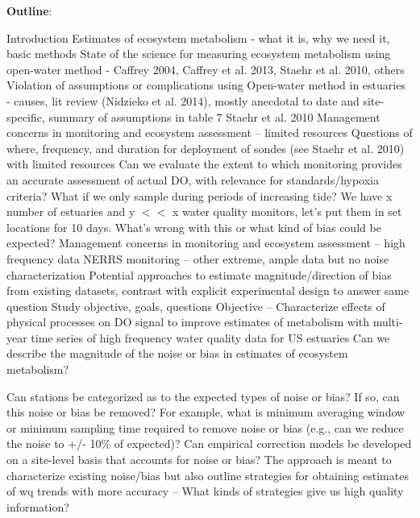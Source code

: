 \documentclass[letterpaper,12pt,oneside]{article}
\begin{document}
\textbf{Outline}:
\begin{outline}
\1 Introduction
\2 Estimates of ecosystem metabolism - what it is, why we need it, basic methods
\2 State of the science for measuring ecosystem metabolism using open-water method - Caffrey 2004, Caffrey et al. 2013, Staehr et al. 2010, others
\2 Violation of assumptions or complications using Open-water method in estuaries - causes, lit review (Nidzieko et al. 2014), mostly anecdotal to date and site-specific, summary of assumptions in table 7 Staehr et al. 2010
\2 Management concerns in monitoring and ecosystem assessment --  limited resources
\3 Questions of where, frequency, and duration for deployment of sondes (see Staehr et al. 2010) with limited resources
\3 Can we evaluate the extent to which monitoring provides an accurate assessment of actual DO, with relevance for standards/hypoxia criteria?  What if we only sample during periods of increasing tide?
\3 We have x number of estuaries and y $<<$ x water quality monitors, let's put them in set locations for 10 days.  What's wrong with this or what kind of bias could be expected? 
\2 Management concerns in monitoring and ecosystem assessment -- high frequency data
\3 NERRS monitoring -- other extreme, ample data but no noise characterization
\3 Potential approaches to estimate magnitude/direction of bias from existing datasets, contrast with explicit experimental design to answer same question
\2 Study objective, goals, questions
\3 Objective -- Characterize effects of physical processes on DO signal to improve estimates of metabolism with multi-year time series of high frequency water quality data for US estuaries
\3 Can we describe the magnitude of the noise or bias in estimates of ecosystem metabolism?

\3 Can stations be categorized as to the expected types of noise or bias?
\3 If so, can this noise or bias be removed?
\4 For example, what is minimum averaging window or minimum sampling time required to remove noise or bias (e.g., can we reduce the noise to +/- 10\% of expected)?  
\4 Can empirical correction models be developed on a site-level basis that accounts for noise or bias?
\3 The approach is meant to characterize existing noise/bias but also outline strategies for obtaining estimates of wq trends with more accuracy -- What kinds of strategies give us high quality information? 


\end{outline}
\end{document}
